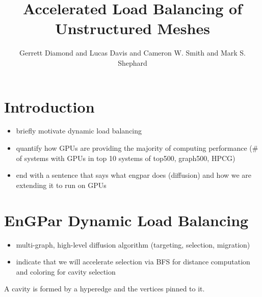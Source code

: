 \documentclass[graybox]{svmult}
\begin{document}
\title*{Accelerated Load Balancing of Unstructured Meshes}
\author{
Gerrett Diamond
and Lucas Davis
and Cameron W. Smith
and Mark S. Shephard
}

\maketitle


\section{Introduction} \label{sec:intro}

\begin{itemize}
  \item briefly motivate dynamic load balancing
  \item quantify how GPUs are providing the majority of computing performance (\# of systems with GPUs in top 10 systems of top500, graph500, HPCG)
  \item end with a sentence that says what engpar does (diffusion) and how we are
extending it to run on GPUs
\end{itemize}

\section{EnGPar Dynamic Load Balancing} \label{sec:engpar}

\begin{itemize}
  \item multi-graph, high-level diffusion algorithm (targeting, selection, migration)
  \item indicate that we will accelerate selection via BFS for distance computation and coloring for cavity selection
\end{itemize}

A cavity is formed by a hyperedge and the vertices pinned to it.
\end{document}
